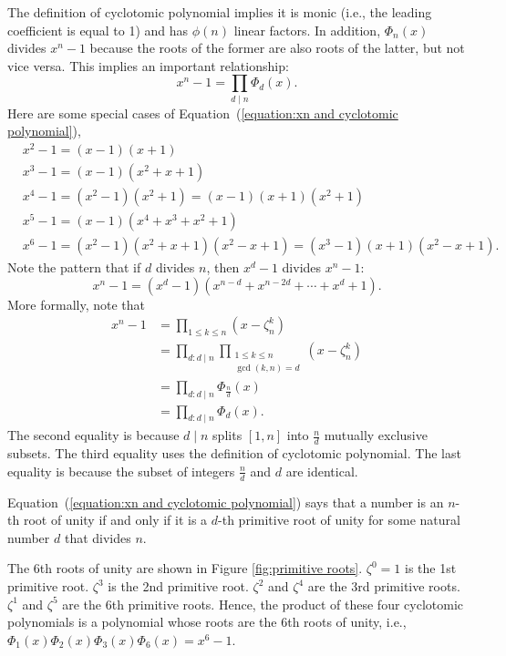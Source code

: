 \documentclass[../main.tex]{subfiles}
\begin{document}
The definition of cyclotomic polynomial implies it is monic (i.e., the leading coefficient is equal to 1) and has $\phi(n)$ linear factors. In addition, $\Phi_n(x)$ divides $x^n - 1$ because the roots of the former are also roots of the latter, but not vice versa. This implies an important relationship: %
\begin{equation}
\label{equation:xn and cyclotomic polynomial}
    x^n-1 = \prod_{d \mid n} \Phi_d(x).
\end{equation}
Here are some special cases of Equation~(\ref{equation:xn and cyclotomic polynomial}),
\begin{align*}
& x^2 - 1 = (x-1)(x+1) \\
& x^3 - 1 = (x-1)(x^2 + x + 1) \\
& x^4 - 1 = (x^2-1)(x^2+1) = (x-1)(x+1)(x^2+1) \\
& x^5 - 1 = (x-1)(x^4 + x^3 + x^2 + 1)\\
& x^6 - 1 = (x^2 - 1)(x^2+x+1)(x^2 - x + 1) = (x^3-1)(x+1)(x^2 - x + 1).
\end{align*}
Note the pattern that if $d$ divides $n$, then $x^d-1$ divides $x^n -1$:
\[ x^n - 1 = (x^d - 1)(x^{n-d} + x^{n-2d} + \cdots + x^d + 1).    
\]
More formally, note that
\begin{align*}
x^n - 1
&= \prod_{1 \le k \le n} (x-\zeta_n^k) \\
&= \prod_{d: d \mid n} \prod_{\substack{1 \le k \le n \\ \gcd(k, n)=d}} (x - \zeta_n^k) \\ 
&=  \prod_{d: d \mid n} \Phi_{\frac{n}{d}}(x) \\
 &=\prod_{d: d \mid n} \Phi_{d}(x).
\end{align*}
The second equality is because $d\mid n$ splits $[1,n]$ into $\frac{n}{d}$ mutually exclusive subsets. The third equality uses the definition of cyclotomic polynomial. The last equality is because the subset of integers $\frac{n}{d}$ and $d$ are identical. 

Equation~(\ref{equation:xn and cyclotomic polynomial}) says that a number is an $n$-th root of unity if and only if it is a $d$-th primitive root of unity for some natural number $d$ that divides $n$. 

\begin{example}
The 6th roots of unity are shown in Figure \ref{fig:primitive roots}. $\zeta^0=1$ is the 1st primitive root. $\zeta^3$ is the 2nd primitive root. $\zeta^2$ and $\zeta^4$ are the 3rd primitive roots. $\zeta^1$ and $\zeta^5$ are the 6th primitive roots. Hence, the product of these four cyclotomic polynomials is a polynomial whose roots are the 6th roots of unity, i.e., $\Phi_1(x)\Phi_2(x)\Phi_3(x)\Phi_6(x)=x^6-1$.
\end{example}
\end{document}
